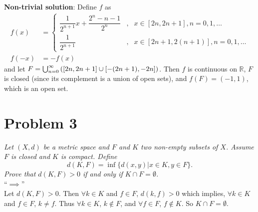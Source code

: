 \documentclass[12pt]{article}
\begin{document}

\noindent\textbf{Non-trivial solution}: Define $f$ as
\begin{align*}
  f(x) &= \left\{\begin{array}{lcl}
    \dfrac{1}{2^{n+1}}x + \dfrac{2^n - n - 1}{2^n} &,& x \in [2n, 2n+1], n = 0, 1, \dots \\[.3cm]
    \dfrac{1}{2^{n+1}} &,& x \in [2n + 1, 2(n+1)], n = 0, 1, \dots
  \end{array}\right. \\
  f(-x) &= -f(x)
\end{align*}
and let $F = \bigcup_{n=0}^{\infty}\qty([2n,2n+1]\cup[-(2n+1),-2n])$.  Then $f$ is continuous on $\mathbb{R}$, $F$ is closed (since its complement is a union of open sets), and $f(F) = (-1, 1)$, which is an open set.

\section*{Problem 3}
{\it Let $(X,d)$ be a metric space and $F$ and $K$ two non-empty subsets of $X$.  Assume $F$ is closed and $K$ is compact.  Define}
\begin{equation}
	\label{problem_3_definition}
	d(K, F) = \inf\{d(x, y) | x \in K, y \in F\}.
\end{equation}
{\it Prove that $d(K, F) > 0$ if and only if $K \cap F = \emptyset$.} \\

\noindent ``$\implies$'' \\

Let $d(K, F) > 0$.  Then $\forall k\in K$ and $f\in F$, $d(k, f) > 0$ which implies, $\forall k\in K$ and $f\in F$, $k \neq f$.  Thus $\forall k \in K$, $k\notin F$, and $\forall f \in F$, $f \notin K$.  So $K \cap F = \emptyset$. \\
\end{document}
